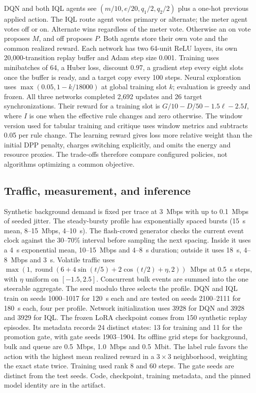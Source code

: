 \documentclass[conference]{IEEEtran}
\begin{document}
DQN and both IQL agents see \((m/10,e/20,q_1/2,q_2/2)\) plus a one-hot previous applied action. The IQL route agent votes primary or alternate; the meter agent votes off or on. Alternate wins regardless of the meter vote. Otherwise an on vote proposes \(M\), and off proposes \(P\). Both agents store their own vote and the common realized reward. Each network has two 64-unit ReLU layers, its own 20,000-transition replay buffer and Adam step size 0.001. Training uses minibatches of 64, a Huber loss, discount 0.97, a gradient step every eight slots once the buffer is ready, and a target copy every 100 steps. Neural exploration uses \(\max(0.05,1-k/18000)\) at global training slot \(k\); evaluation is greedy and frozen. All three networks completed 2,692 updates and 26 target synchronizations. Their reward for a training slot is \(G/10-D/50-1.5\ell-2.5I\), where \(I\) is one when the effective rule changes and zero otherwise. The window version used for tabular training and critique uses window metrics and subtracts 0.05 per rule change. The learning reward gives loss more relative weight than the initial DPP penalty, charges switching explicitly, and omits the energy and resource proxies. The trade-offs therefore compare configured policies, not algorithms optimizing a common objective.

\subsection{Traffic, measurement, and inference}
Synthetic background demand is fixed per trace at 3~Mbps with up to 0.1~Mbps of seeded jitter. The steady-bursty profile has exponentially spaced bursts (15~s mean, 8--15~Mbps, 4--10~s). The flash-crowd generator checks the current event clock against the 30--70\% interval before sampling the next spacing. Inside it uses a 4~s exponential mean, 10--15~Mbps and 4--8~s duration; outside it uses 18~s, 4--8~Mbps and 3~s. Volatile traffic uses \(\max(1,\operatorname{round}(6+4\sin(t/5)+2\cos(t/2)+\eta,2))\)~Mbps at 0.5~s steps, with \(\eta\) uniform on \([-1.5,2.5]\). Concurrent bulk events are summed into the one steerable aggregate. The seed modulo three selects the profile. DQN and IQL train on seeds 1000--1017 for 120~s each and are tested on seeds 2100--2111 for 180~s each, four per profile. Network initialization uses 3928 for DQN and 3928 and 3929 for IQL. The frozen LoRA checkpoint comes from 150 synthetic replay episodes. Its metadata records 24 distinct states: 13 for training and 11 for the promotion gate, with gate seeds 1903--1904. Its offline grid steps for background, bulk and queue are 0.5~Mbps, 1.0~Mbps and 0.5~Mbit. The label rule favors the action with the highest mean realized reward in a \(3\times3\) neighborhood, weighting the exact state twice. Training used rank 8 and 60 steps. The gate seeds are distinct from the test seeds. Code, checkpoint, training metadata, and the pinned model identity are in the artifact.
\end{document}
